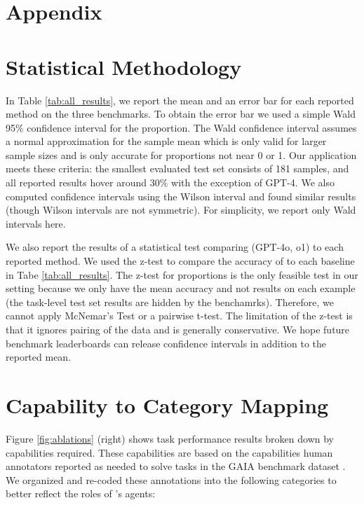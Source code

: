 \newpage 
\appendix
\section*{Appendix}



\section{Statistical Methodology}\label{apx:stats_results}

In Table \ref{tab:all_results}, we report the mean and an error bar for each reported method on the three benchmarks. To obtain the error bar we used a simple Wald 95\% confidence interval for the proportion. The Wald confidence interval assumes a normal approximation for the sample mean which is only valid for larger sample sizes and is only accurate for proportions not near 0 or 1. Our application meets these criteria: the smallest evaluated test set consists of 181 samples, and all reported results hover around 30\% with the exception of GPT-4. We also computed confidence intervals using the Wilson interval and found similar results (though Wilson intervals are not symmetric). For simplicity, we report only Wald intervals here. 

We also report the results of a statistical test comparing \team (GPT-4o, o1) to each reported method. We used the z-test to compare the accuracy of \team to each baseline in Tabe \ref{tab:all_results}. The z-test for proportions is the only feasible test in our setting because we only have the mean accuracy and not results on each example (the task-level test set results are hidden by the benchamrks). Therefore, we cannot apply McNemar's Test or a pairwise t-test. The limitation of the z-test is that it ignores pairing of the data and is generally conservative. We hope future benchmark leaderboards can release confidence intervals in addition to the reported mean.

\section{Capability to Category Mapping}\label{apx:capability_mapping}

Figure \ref{fig:ablations} (right) shows task performance results broken down by capabilities required. These capabilities are based on the capabilities human annotators reported as needed to solve tasks in the GAIA benchmark dataset \cite{mialon2023gaiabenchmarkgeneralai}. We organized and re-coded these annotations into the following categories to better reflect the roles of \team's agents:

